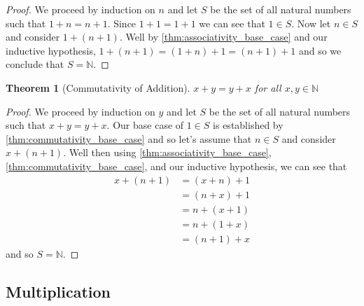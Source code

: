 \documentclass{article}
\theoremstyle{definition}
\theoremstyle{definition}
\theoremstyle{plain}
\theoremstyle{remark}
\theoremstyle{plain}
\newtheorem{theorem}{Theorem}[section]
\theoremstyle{remark}
\theoremstyle{plain}
\theoremstyle{plain}
\theoremstyle{plain}
\theoremstyle{plain}
\begin{document}
\begin{proof}
  We proceed by induction on \( n \) and let \( S \) be the set of all natural 
  numbers such that \( 1 + n = n + 1 \). Since \( 1 + 1 = 1 + 1 \) we can see 
  that \( 1 \in S \). Now let \( n \in S \) and consider \( 1 + (n + 1)\). Well
  by \autoref{thm:associativity_base_case} and our inductive hypothesis, 
  \( 1 + (n + 1) = (1 + n) + 1 = (n + 1) + 1 \) and so we conclude that 
  \( S = \mathbb{N} \).  
\end{proof}

\begin{theorem}[Commutativity of Addition]
  \( x + y = y + x \) for all \( x, y \in \mathbb{N} \)  
\end{theorem}

\begin{proof}
  We proceed by induction on \( y \) and let \( S \) be the set of all natural 
  numbers such that \( x + y = y + x \). Our base case of \( 1 \in S \) is 
  established by \autoref{thm:commutativity_base_case} and so let's assume that 
  \( n \in S \) and consider \( x + (n + 1) \). Well then using 
  \autoref{thm:associativity_base_case}, \autoref{thm:commutativity_base_case}, 
  and our inductive hypothesis, we can see that 
  \begin{align*}
    x + (n + 1) &= (x + n) + 1 \\
                &= (n + x) + 1 \\ 
                &= n + (x + 1) \\
                &= n + (1 + x) \\
                &= (n + 1) + x
  \end{align*}
  and so \( S = \mathbb{N} \).
\end{proof}

\newpage

\subsection{Multiplication}





\end{document}
